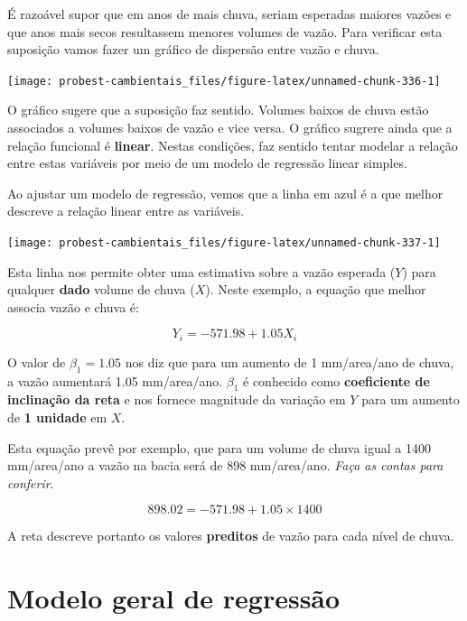 \documentclass[
]{book}
\begin{document}
É razoável supor que em anos de mais chuva, seriam esperadas maiores vazões e que anos mais secos resultassem menores volumes de vazão. Para verificar esta suposição vamos fazer um gráfico de dispersão entre vazão e chuva.

\begin{center}\texttt{[image: probest-cambientais\_files/figure-latex/unnamed-chunk-336-1]} \end{center}

O gráfico sugere que a suposição faz sentido. Volumes baixos de chuva estão associados a volumes baixos de vazão e vice versa. O gráfico sugrere ainda que a relação funcional é \textbf{linear}. Nestas condições, faz sentido tentar modelar a relação entre estas variáveis por meio de um modelo de regressão linear simples.

Ao ajustar um modelo de regressão, vemos que a linha em azul é a que melhor descreve a relação linear entre as variáveis.

\begin{center}\texttt{[image: probest-cambientais\_files/figure-latex/unnamed-chunk-337-1]} \end{center}

Esta linha nos permite obter uma estimativa sobre a vazão esperada (\(Y\)) para qualquer \textbf{dado} volume de chuva (\(X\)). Neste exemplo, a equação que melhor associa vazão e chuva é:

\[Y_i = -571.98 + 1.05 X_i\]

O valor de \(\beta_1 = 1.05\) nos diz que para um aumento de 1 mm/area/ano de chuva, a vazão aumentará 1.05 mm/area/ano. \(\beta_1\) é conhecido como \textbf{coeficiente de inclinação da reta} e nos fornece magnitude da variação em \(Y\) para um aumento de \textbf{1 unidade} em \(X\).

Esta equação prevê por exemplo, que para um volume de chuva igual a 1400 mm/area/ano a vazão na bacia será de 898 mm/area/ano. \emph{Faça as contas para conferir}.

\[898.02 = -571.98 + 1.05 \times 1400\]

A reta descreve portanto os valores \textbf{preditos} de vazão para cada nível de chuva.

\hypertarget{modelo-geral-de-regressuxe3o}{%
\section{Modelo geral de regressão}\label{modelo-geral-de-regressuxe3o}}
\end{document}
